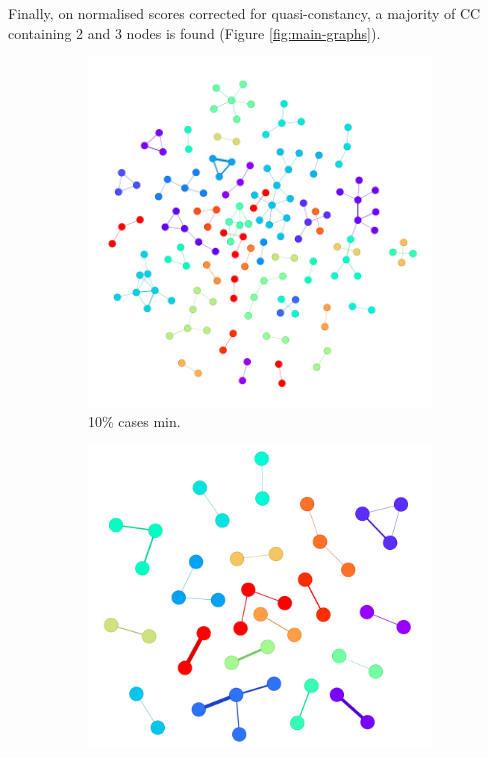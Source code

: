 Finally, on normalised scores corrected for quasi-constancy, a majority of CC containing 2 and 3 nodes is found (Figure \ref{fig:main-graphs}). 
\\
\begin{figure}[!ht]
    \centering
	\begin{subfigure}[b]{0.30\linewidth}
		\includegraphics[width=\linewidth]{Minor Thesis/figures/graphs/main/g95102028.png}
		\caption{10\% cases min.}
	\end{subfigure}
	\hfill
	\begin{subfigure}[b]{0.30\linewidth}
		\includegraphics[width=\linewidth]{Minor Thesis/figures/graphs/main/g95202028.png}

\end{subfigure}
\end{figure}

